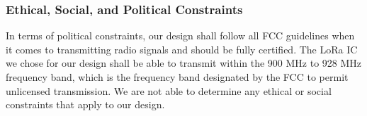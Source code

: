 \subsubsection{Ethical, Social, and Political Constraints}
In terms of political constraints, our design shall follow all FCC guidelines when it comes to transmitting radio signals and should be fully certified. The LoRa IC we chose for our design shall be able to transmit within the 900 MHz to 928 MHz frequency band, which is the frequency band designated by the FCC to permit unlicensed transmission. We are not able to determine any ethical or social constraints that apply to our design.